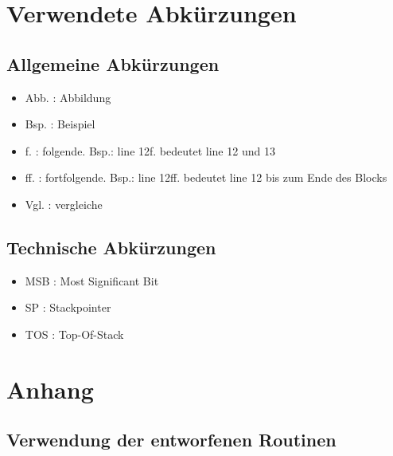\documentclass[fleqn, a4paper, 1pt]{article}       %
\begin{document}
\section{Verwendete Abkürzungen}
\subsection{Allgemeine Abkürzungen}
\begin{itemize}
    \item Abb. : Abbildung
    \item Bsp. : Beispiel
    \item f. : folgende. Bsp.: line 12f. bedeutet line 12 und 13
    \item ff. : fortfolgende. Bsp.: line 12ff. bedeutet line 12 bis zum Ende des Blocks
    \item Vgl. : vergleiche
\end{itemize}

\subsection{Technische Abkürzungen}
\begin{itemize}
    \item MSB : Most Significant Bit
    \item SP : Stackpointer
    \item TOS : Top-Of-Stack
\end{itemize}

\newpage
\appendix %
\section{Anhang}
\subsection{Verwendung der entworfenen Routinen}
\end{document}
